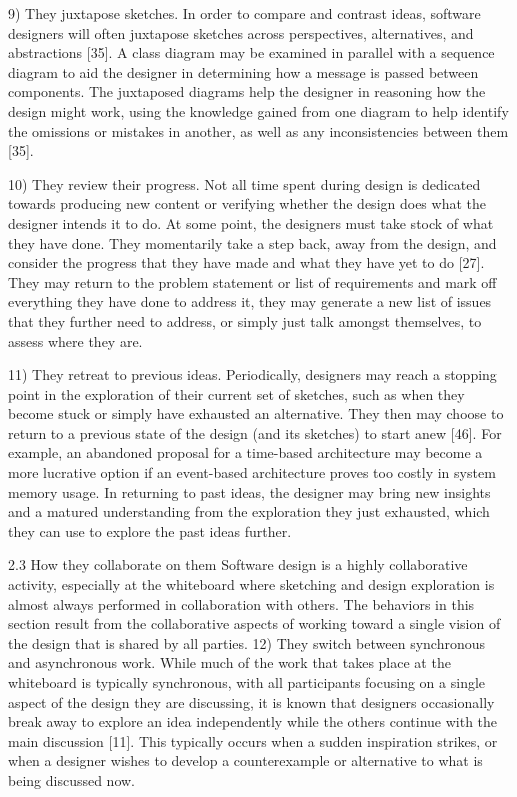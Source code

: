 9)	They juxtapose sketches. In order to compare and contrast ideas, software designers will often juxtapose sketches across perspectives, alternatives, and abstractions [35]. A class diagram may be examined in parallel with a sequence diagram to aid the designer in determining how a message is passed between components. The juxtaposed diagrams help the designer in reasoning how the design might work, using the knowledge gained from one diagram to help identify the omissions or mistakes in another, as well as any inconsistencies between them [35]. 

10)	They review their progress. Not all time spent during design is dedicated towards producing new content or verifying whether the design does what the designer intends it to do. At some point, the designers must take stock of what they have done. They momentarily take a step back, away from the design, and consider the progress that they have made and what they have yet to do [27]. They may return to the problem statement or list of requirements and mark off everything they have done to address it, they may generate a new list of issues that they further need to address, or simply just talk amongst themselves, to assess where they are.
 
11)	They retreat to previous ideas. Periodically, designers may reach a stopping point in the exploration of their current set of sketches, such as when they become stuck or simply have exhausted an alternative. They then may choose to return to a previous state of the design (and its sketches) to start anew [46]. For example, an abandoned proposal for a time-based architecture may become a more lucrative option if an event-based architecture proves too costly in system memory usage. In returning to past ideas, the designer may bring new insights and a matured understanding from the exploration they just exhausted, which they can use to explore the past ideas further.

2.3	How they collaborate on them
Software design is a highly collaborative activity, especially at the whiteboard where sketching and design exploration is almost always performed in collaboration with others. The behaviors in this section result from the collaborative aspects of working toward a single vision of the design that is shared by all parties.
12)	They switch between synchronous and asynchronous work. While much of the work that takes place at the whiteboard is typically synchronous, with all participants focusing on a single aspect of the design they are discussing, it is known that designers occasionally break away to explore an idea independently while the others continue with the main discussion [11]. This typically occurs when a sudden inspiration strikes, or when a designer wishes to develop a counterexample or alternative to what is being discussed now.

